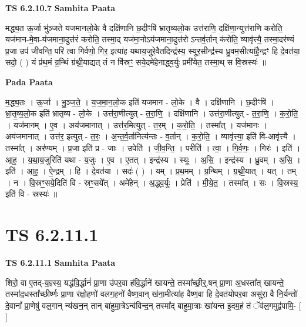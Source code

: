\documentclass[17pt]{extarticle}
\begin{document}
\textbf{TS 6.2.10.7 } \newline
\textbf{Samhita Paata} \newline

मद्ध्य॒त ऊ॒र्जा भु॑ञ्जते यजमानलो॒के वै दक्षि॑णानि छ॒दीꣳषि॑ भ्रातृव्यलो॒क उत्त॑राणि॒ दक्षि॑णा॒न्युत्त॑राणि करोति॒ यज॑मान-मे॒वा-य॑जमाना॒दुत्त॑रं करोति॒ तस्मा॒द् यज॑मा॒नोऽय॑जमाना॒दुत्त॑रो ऽन्तर्व॒र्तान् क॑रोति॒ व्यावृ॑त्त्यै॒ तस्मा॒दर॑ण्यं प्र॒जा उप॑ जीवन्ति॒ परि॑ त्वा गिर्वणो॒ गिर॒ इत्या॑ह यथाय॒जुरे॒वैतदिन्द्र॑स्य॒ स्यूर॒सीन्द्र॑स्य ध्रु॒वम॒सीत्या॑है॒न्द्रꣳ हि दे॒वत॑या॒ सदो॒ ( ) यं प्र॑थ॒मं ग्र॒न्थिं ग्र॑थ्नी॒याद्यत् तं न वि॑स्रꣳ॒॒ सये॒दमे॑हेनाद्ध्व॒र्युः प्रमी॑येत॒ तस्मा॒थ् स वि॒स्रस्यः॑ ॥ \newline

\textbf{Pada Paata} \newline

म॒द्ध्य॒तः । ऊ॒र्जा । भु॒ञ्ज॒ते॒ । य॒ज॒मा॒न॒लो॒क इति॑ यजमान - लो॒के । वै । दक्षि॑णानि । छ॒दीꣳषि॑ । भ्रा॒तृ॒व्य॒लो॒क इति॑ भ्रातृव्य - लो॒के । उत्त॑रा॒णीत्युत् - त॒रा॒णि॒ । दक्षि॑णानि । उत्त॑रा॒णीत्युत् - त॒रा॒णि॒ । क॒रो॒ति॒ । यज॑मानम् । ए॒व । अय॑जमानात् । उत्त॑र॒मित्युत् - त॒र॒म् । क॒रो॒ति॒ । तस्मा᳚त् । यज॑मानः । अय॑जमानात् । उत्त॑र॒ इत्युत् - त॒रः॒ । अ॒न्त॒र्व॒र्तानित्य॑न्तः - व॒र्तान् । क॒रो॒ति॒ । व्यावृ॑त्त्या॒ इति॑ वि-आवृ॑त्त्यै । तस्मा᳚त् । अर॑ण्यम् । प्र॒जा इति॑ प्र - जाः । उपेति॑ । जी॒व॒न्ति॒ । परीति॑ । त्वा॒ । गि॒र्व॒णः॒ । गिरः॑ । इति॑ । आ॒ह॒ । य॒था॒य॒जुरिति॑ यथा - य॒जुः । ए॒व । ए॒तत् । इन्द्र॑स्य । स्यूः । अ॒सि॒ । इन्द्र॑स्य । ध्रु॒वम् । अ॒सि॒ । इति॑ । आ॒ह॒ । ऐ॒न्द्रम् । हि । दे॒वत॑या । सदः॑ ( ) । यम् । प्र॒थ॒मम् । ग्र॒न्थिम् । ग्र॒थ्नी॒यात् । यत् । तम् । न । वि॒स्रꣳ॒॒सये॒दिति॑ वि - स्रꣳ॒॒सये᳚त् । अमे॑हेन् । अ॒द्ध्व॒र्युः । प्रेति॑ । मी॒ये॒त॒ । तस्मा᳚त् । सः । वि॒स्रस्य॒ इति॑ वि - स्रस्यः॑ ॥  \newline





\section{ TS 6.2.11.1 }

\textbf{TS 6.2.11.1 } \newline
\textbf{Samhita Paata} \newline

शिरो॒ वा ए॒तद्-य॒ज्ञ्स्य॒ यद्ध॑वि॒र्द्धानं॑ प्रा॒णा उ॑पर॒वा ह॑वि॒र्द्धाने॑ खायन्ते॒ तस्मा᳚च्छी॒र्॒.षन् प्रा॒णा अ॒धस्ता᳚त् खायन्ते॒ तस्मा॑द॒धस्ता᳚च्छीर्ष्णः प्रा॒णा र॑क्षो॒हणो॑ वलग॒हनो॑ वैष्ण॒वान् ख॑ना॒मीत्या॑ह वैष्ण॒वा हि दे॒वत॑योपर॒वा असु॑रा॒ वै नि॒र्यन्तो॑ दे॒वानां᳚ प्रा॒णेषु॑ वल॒गान् न्य॑खन॒न् तान् बा॑हुमा॒त्रेऽन्व॑विन्द॒न् तस्मा᳚द् बाहुमा॒त्राः खा॑यन्त इ॒दम॒हं तं ॅव॑ल॒गमुद्व॑पामि॒- [  ] \newline
\end{document}
